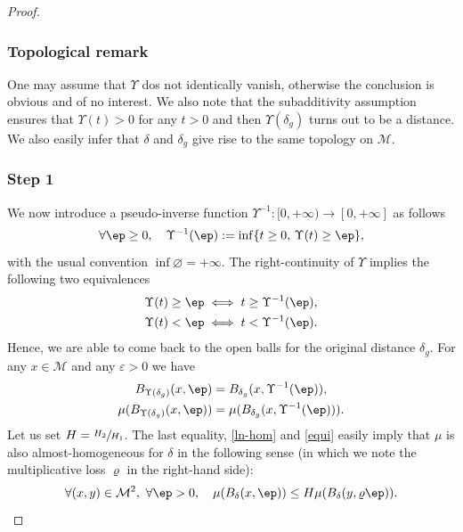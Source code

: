 \skpt
\begin{proof}\vspace*{-.5\baselineskip}
\subsubsection*{Topological remark}
One may assume that $\Upsilon$ dos not identically vanish, otherwise the conclusion is obvious and of no interest.
We also note that the subadditivity assumption ensures that $\Upsilon(t)>0$ for any $t>0$ and then $\Upsilon(\delta_g)$ turns out to be a distance. We also easily infer that $\delta$ and $\delta_g$ give rise to the same topology on $\mathcal{M}$.

\subsubsection*{Step 1} We now introduce a pseudo-inverse function $\Upsilon^{-1}:[0,+\infty)\to [0,+\infty]$ as follows
\begin{equation*}
\forall \ep\geq 0, \quad \Upsilon^{-1}(\ep):=\inf\{t\geq 0,\, \Upsilon(t)\geq \ep\},
\end{equation*}
with the usual convention $\inf \varnothing=+\infty$.
The right-continuity of $\Upsilon$ implies the following two equivalences
\begin{align*}
\Upsilon(t)\geq \ep &\iff t \geq \Upsilon^{-1}(\ep), \\
\Upsilon(t)<\ep &\iff t <\Upsilon^{-1}(\ep).
\end{align*}
Hence, we are able to come back to the open balls for the original distance $\delta_g$. For any $x\in \mathcal{M}$ and any $\varepsilon>0$ we have
\begin{align*}
B_{\Upsilon(\delta_g)}(x,\ep)&=
B_{\delta_g}(x,\Upsilon^{-1}(\ep)),\\
\mu(B_{\Upsilon(\delta_g)}(x,\ep))&=
\mu(B_{\delta_g}(x,\Upsilon^{-1}(\ep))).
\end{align*}
Let us set $H=\sfrac{H_2}{H_1}$. The last equality, \eqref{ln-hom} and \eqref{equi} easily imply that $\mu$ is also almost-homogeneous for $\delta$ in the following sense (in which we note the multiplicative loss $\varrho$ in the right-hand side):
\begin{equation}\label{homogg}
\forall (x,y)\in \mathcal{M}^2, \ \forall \ep>0,\quad \mu(B_{\delta}(x,\ep))\leq H \mu(B_{\delta}(y,\varrho \ep)).
\end{equation}

\end{proof}

